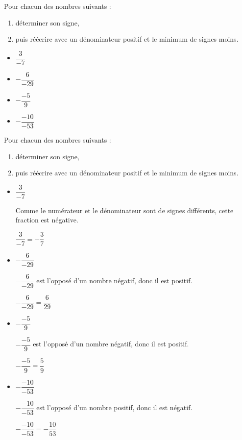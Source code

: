\begin{exercice*}
    Pour chacun des nombres suivants :
    \begin{enumerate}
        \item déterminer son signe,
        \item puis réécrire avec un dénominateur positif et le minimum de signes moins.        
    \end{enumerate}
    \begin{multicols}{2}
        \begin{itemize}
            \item $\dfrac{3}{-7}$
            \item $-\dfrac{6}{-29}$
            \item $-\dfrac{-5}{9}$
            \item $-\dfrac{-10}{-53}$
        \end{itemize}
    \end{multicols}
    
\end{exercice*}
\begin{corrige}
    Pour chacun des nombres suivants :

    \begin{enumerate}
        \item déterminer son signe,
        \item puis réécrire avec un dénominateur positif et le minimum de signes moins.        
    \end{enumerate}
    
    \begin{itemize}
        \item $\dfrac{3}{-7}$       
        
        {\red Comme le numérateur et le dénominateur sont de signes différents, cette fraction est négative.
        
        $\dfrac{3}{-7} = -\dfrac{3}{7}$
        }
        \item $-\dfrac{6}{-29}$     
        
        {\red $-\dfrac{6}{-29}$ est l'opposé d'un nombre négatif, donc il est positif.
        
        $-\dfrac{6}{-29} = \dfrac{6}{29}$
        }
    \end{itemize}
    \Coupe
    \begin{itemize}
        \item $-\dfrac{-5}{9}$      
        
        {\red $-\dfrac{-5}{9}$ est l'opposé d'un nombre négatif, donc il est positif.
        
        $-\dfrac{-5}{9} = \dfrac{5}{9}$
        }
        \item $-\dfrac{-10}{-53}$   
        {\red $-\dfrac{-10}{-53}$ est l'opposé d'un nombre positif, donc il est négatif.
        
        $-\dfrac{-10}{-53} = -\dfrac{10}{53}$            
        }
    \end{itemize}
    

\end{corrige}

